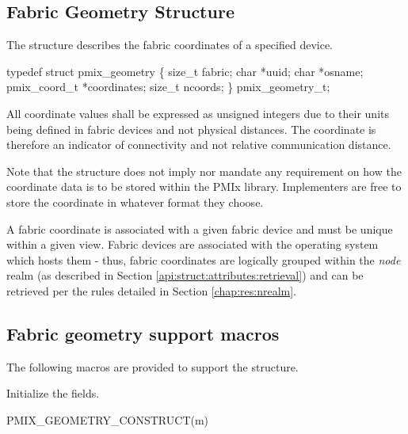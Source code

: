 \subsection{Fabric Geometry Structure}

The  structure describes the fabric coordinates of a specified device.

\cspecificstart
\begin{codepar}
typedef struct pmix_geometry \{
    size_t fabric;
    char *uuid;
    char *osname;
    pmix_coord_t *coordinates;
    size_t ncoords;
\} pmix_geometry_t;
\end{codepar}
\cspecificend

All coordinate values shall be expressed as unsigned integers due to their units being defined in fabric devices and not physical distances. The coordinate is therefore an indicator of connectivity and not relative communication distance.

\adviceimplstart
Note that the  structure does not imply nor mandate any requirement on how the coordinate data is to be stored within the \ac{PMIx} library. Implementers are free to store the coordinate in whatever format they choose.
\adviceimplend

A fabric coordinate is associated with a given fabric device and must be unique within a given view. Fabric devices are associated with the operating system which hosts them - thus, fabric coordinates are logically grouped within the \emph{node} realm (as described in Section \ref{api:struct:attributes:retrieval}) and can be retrieved per the rules detailed in Section \ref{chap:res:nrealm}.


\subsection{Fabric geometry support macros}
\label{api:netgeom:macros}

The following macros are provided to support the  structure.


Initialize the  fields.

\cspecificstart
\begin{codepar}
PMIX_GEOMETRY_CONSTRUCT(m)
\end{codepar}
\cspecificend

